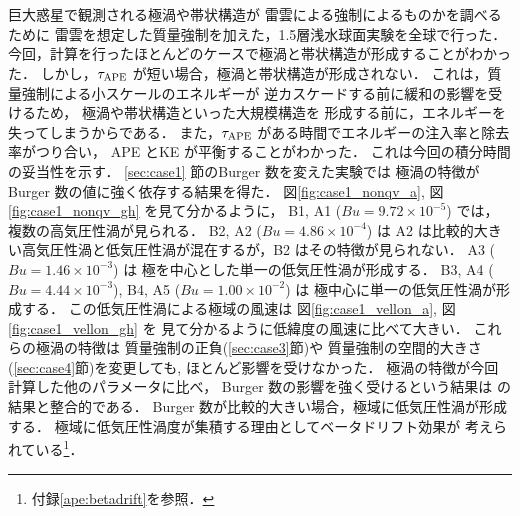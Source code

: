 \documentclass[a4j,12pt,openbib,oneside]{jreport}
\begin{document}
\chapter{}
\label{chap:4}
%
%
巨大惑星で観測される極渦や帯状構造が
雷雲による強制によるものかを調べるために
雷雲を想定した質量強制を加えた，1.5層浅水球面実験を全球で行った．
%
今回，計算を行ったほとんどのケースで極渦と帯状構造が形成することがわかった．
しかし，$\tau_{\rm{APE}}$ が短い場合，極渦と帯状構造が形成されない．
これは，質量強制による小スケールのエネルギーが
逆カスケードする前に緩和の影響を受けるため，
極渦や帯状構造といった大規模構造を
形成する前に，エネルギーを失ってしまうからである．
また，$\tau_{\rm{APE}}$ がある時間でエネルギーの注入率と除去率がつり合い，
APE とKE が平衡することがわかった．
これは今回の積分時間の妥当性を示す．
%
%
\ref{sec:case1} 節のBurger 数を変えた実験では
極渦の特徴がBurger 数の値に強く依存する結果を得た．
%
図\ref{fig:case1_nonqv_a}, 図\ref{fig:case1_nonqv_gh} を見て分かるように，
B1, A1 ($Bu = 9.72\times 10^{-5}$) では，
複数の高気圧性渦が見られる．
%
B2, A2 ($Bu = 4.86\times 10^{-4}$) は
A2 は比較的大きい高気圧性渦と低気圧性渦が混在するが，B2 はその特徴が見られない．
%
A3 ($Bu = 1.46\times 10^{-3}$) は
極を中心とした単一の低気圧性渦が形成する．
%
B3, A4 ($Bu = 4.44 \times 10^{-3}$), 
B4, A5 ($Bu = 1.00 \times 10^{-2}$) は
極中心に単一の低気圧性渦が形成する．
この低気圧性渦による極域の風速は
図\ref{fig:case1_vellon_a}, 図\ref{fig:case1_vellon_gh} を
見て分かるように低緯度の風速に比べて大きい．
%
これらの極渦の特徴は
質量強制の正負(\ref{sec:case3}節)や
質量強制の空間的大きさ(\ref{sec:case4}節)を変更しても, 
ほとんど影響を受けなかった．
% 
極渦の特徴が今回計算した他のパラメータに比べ，
Burger 数の影響を強く受けるという結果は
\cite{Brueshaber2019} の結果と整合的である．
%
Burger 数が比較的大きい場合，極域に低気圧性渦が形成する．
極域に低気圧性渦度が集積する理由としてベータドリフト効果が
考えられている\footnote{付録\ref{ape:betadrift}を参照．}．
%
\end{document}
